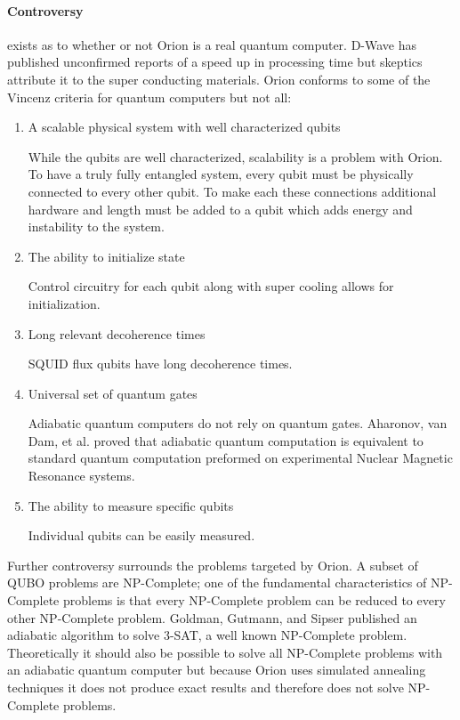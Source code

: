 \documentclass[10pt]{article}
\begin{document}
\paragraph{Controversy} exists as to whether or not Orion is a real quantum computer.  D-Wave has published unconfirmed reports of a speed up in processing time but skeptics attribute it to the super conducting materials.  Orion conforms to some of the Vincenz criteria for quantum computers but not all:
  \begin{enumerate}
  \item A scalable physical system with well characterized qubits
  
  While the qubits are well characterized, scalability is a problem with Orion.  To have a truly fully entangled system, every qubit must be physically connected to every other qubit.  To make each these connections additional hardware and length must be added to a qubit which adds energy and instability to the system.
  \item The ability to initialize state

  Control circuitry for each qubit along with super cooling allows for initialization.

  \item Long relevant decoherence times

  SQUID flux qubits have long decoherence times.

  \item Universal set of quantum gates
  
  Adiabatic quantum computers do not rely on quantum gates.  Aharonov, van Dam, et al. proved that adiabatic quantum computation is equivalent to standard quantum computation preformed on experimental Nuclear Magnetic Resonance systems.

  \item The ability to measure specific qubits

  Individual qubits can be easily measured.

 \end{enumerate}

Further controversy surrounds the problems targeted by Orion.  A subset of QUBO problems are NP-Complete; one of the fundamental characteristics of NP-Complete problems is that every NP-Complete problem can be reduced to every other NP-Complete problem.  Goldman, Gutmann, and Sipser published an adiabatic algorithm to solve 3-SAT, a well known NP-Complete problem.  Theoretically it should also be possible to solve all NP-Complete problems with an adiabatic quantum computer but because Orion uses simulated annealing techniques it does not produce exact results and therefore does not solve NP-Complete problems.
\end{document}
